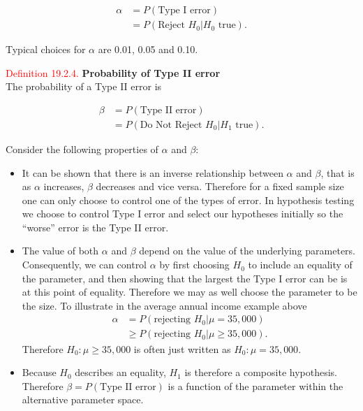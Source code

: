 \documentclass[
]{book}
\providecommand{\tightlist}{%
  \setlength{\itemsep}{0pt}\setlength{\parskip}{0pt}}
\begin{document}
\begin{align*}
\alpha &= P(\text{Type I error}) \\
&= P(\text{Reject } H_0 | H_0 \text{ true}).
\end{align*}

Typical choices for \(\alpha\) are 0.01, 0.05 and 0.10.

\leavevmode{}%
\textcolor{red}{Definition 19.2.4.}
{\textbf{Probability of Type II error}}\\
The probability of a Type II error is

\begin{align*}
\beta &= P(\text{Type II error}) \\
&= P(\text{Do Not Reject } H_0 | H_1 \text{ true}).
\end{align*}

Consider the following properties of \(\alpha\) and \(\beta\):

\begin{itemize}
\tightlist
\item
  It can be shown that there is an inverse relationship between \(\alpha\) and \(\beta\), that is as \(\alpha\) increases, \(\beta\) decreases and vice versa. Therefore for a fixed sample size one can only choose to control one of the types of error. In hypothesis testing we choose to control Type I error and select our hypotheses initially so the ``worse'' error is the Type II error.\\
\item
  The value of both \(\alpha\) and \(\beta\) depend on the value of the underlying parameters. Consequently, we can control \(\alpha\) by first choosing \(H_0\) to include an equality of the parameter, and then showing that the largest the Type I error can be is at this point of equality. Therefore we may as well choose the parameter to be the size. To illustrate in the average annual income example above
  \begin{align*}
  \alpha &= P (\text{rejecting } H_0 | \mu = 35,000) \\
  &\geq P(\text{rejecting } H_0 | \mu \geq 35,000).
  \end{align*}
  Therefore \(H_0: \mu \geq 35,000\) is often just written as \(H_0: \mu = 35,000\).\\
\item
  Because \(H_0\) describes an equality, \(H_1\) is therefore a composite hypothesis. Therefore \(\beta = P(\text{Type II error})\) is a function of the parameter within the alternative parameter space.
\end{itemize}
\end{document}

